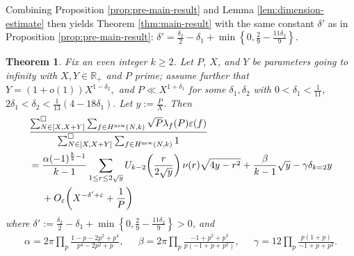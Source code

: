 \documentclass[12pt,letterpaper,reqno]{amsart}
\theoremstyle{plain}
\newtheorem{theorem}{Theorem}[section]
\theoremstyle{definition}
\numberwithin{equation}{section}
\numberwithin{figure}{section}
\numberwithin{table}{section}
\newcommand{\lrp}[1]{\!\left(#1\right)}
\newcommand{\lrcb}[1]{\!\left\{#1\right\}}
\begin{document}
Combining Proposition \ref{prop:pre-main-result} and Lemma \ref{lem:dimension-estimate} then 
yields Theorem \ref{thm:main-result} with the same constant $\delta'$ as in Proposition \ref{prop:pre-main-result}: 
$
    \delta' = \frac{\delta_2}{2} - \delta_1 +\min\lrcb{0,\frac{2}{9}-\frac{11\delta_2}{9}}
$.

{
\renewcommand{\thetheorem}{\ref{thm:main-result}}
\addtocounter{theorem}{-1}
\begin{theorem}
Fix an even integer $k\ge 2$. Let $P$, $X$, and $Y$ be parameters going to infinity with $X,Y\in \mathbb{R}_{+}$ and $P$ prime; assume further that $Y=(1+o(1))X^{1-\delta_2},$ and $P\ll X^{1+\delta_1}$ for some $\delta_1,\delta_2$ with $0<\delta_1<\frac{1}{11}$, $2\delta_1<\delta_2<\frac{1}{13} (4-18\delta_1).$ Let $y := \frac{P}{X}$. Then 
\begin{align}
    &\frac{
    \sum_{N\in[X,X+Y]}^\square \sum_{f\in H^{\rm new}(N,k)}\sqrt{P}\lambda_f(P)\varepsilon(f)
    }{
    \sum_{N\in[X,X+Y]}^\square \sum_{f\in H^{\rm new}(N,k)}1 
    }  \\
    &=\frac{\alpha(-1)^{\frac{k}{2}-1}}{k-1}\sum_{1\leq r\leq 2\sqrt{y}}U_{k-2}\lrp{\frac{r}{2\sqrt{y}}}\nu(r)\sqrt{4y-r^2} +\frac{\beta}{k-1}\sqrt{y}-\gamma \delta_{k=2}y 
    \label{eqn:temp_main-term-of-main-thm}
    \\
    &\quad\ +O_\varepsilon\lrp{X^{-\delta'+\varepsilon}+\frac{1}{P}}
\end{align}
where 
$
    \delta' := \frac{\delta_2}{2} - \delta_1 +\min\lrcb{0,\frac{2}{9}-\frac{11\delta_2}{9}} > 0
$,
and 
\begin{align}
\alpha= 2\pi \prod_{p}\frac{1-p-2p^2+p^4}{p^4-2p^2+p}, \quad\ \ \beta=2\pi\prod_{p}\frac{-1+p^2+p^3}{p(-1+p+p^2)}, \quad \ \ 
\gamma=12\prod_{p}\frac{p(1+p)}{-1+p+p^2}.
\end{align}
\end{theorem}
}
\end{document}
